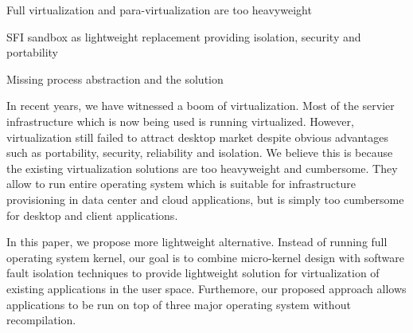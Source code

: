 \begin{structure}
  \item Full virtualization and para-virtualization are too heavyweight
  \item SFI sandbox as lightweight replacement providing isolation,
    security and portability
  \item Missing process abstraction and the solution
\end{structure}

In recent years, we have witnessed a boom of virtualization. Most of the
servier infrastructure which is now being used is running virtualized.
However, virtualization still failed to attract desktop market despite
obvious advantages such as portability, security, reliability and
isolation. We believe this is because the existing virtualization
solutions are too heavyweight and cumbersome. They allow to run entire
operating system which is suitable for infrastructure provisioning in
data center and cloud applications, but is simply too cumbersome for
desktop and client applications.

In this paper, we propose more lightweight alternative. Instead of
running full operating system kernel, our goal is to combine
micro-kernel design with software fault isolation techniques to provide
lightweight solution for virtualization of existing applications in the
user space.  Furthemore, our proposed approach allows applications to be
run on top of three major operating system without recompilation.
